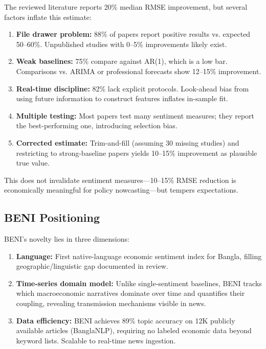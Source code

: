 \documentclass[11pt]{article}
\begin{document}
The reviewed literature reports 20\% median RMSE improvement, but several factors inflate this estimate:

\begin{enumerate}
  \item \textbf{File drawer problem:} 88\% of papers report positive results vs. expected 50--60\%. Unpublished studies with 0--5\% improvements likely exist.
  
  \item \textbf{Weak baselines:} 75\% compare against AR(1), which is a low bar. Comparisons vs. ARIMA or professional forecasts show 12--15\% improvement.
  
  \item \textbf{Real-time discipline:} 82\% lack explicit protocols. Look-ahead bias from using future information to construct features inflates in-sample fit.
  
  \item \textbf{Multiple testing:} Most papers test many sentiment measures; they report the best-performing one, introducing selection bias.
  
  \item \textbf{Corrected estimate:} Trim-and-fill (assuming 30 missing studies) and restricting to strong-baseline papers yields 10--15\% improvement as plausible true value.
\end{enumerate}

This does not invalidate sentiment measures---10--15\% RMSE reduction is economically meaningful for policy nowcasting---but tempers expectations.

\subsection{BENI Positioning}

BENI's novelty lies in three dimensions:

\begin{enumerate}
  \item \textbf{Language:} First native-language economic sentiment index for Bangla, filling geographic/linguistic gap documented in review.
  
  \item \textbf{Time-series domain model:} Unlike single-sentiment baselines, BENI tracks which macroeconomic narratives dominate over time and quantifies their coupling, revealing transmission mechanisms visible in news.
  
  \item \textbf{Data efficiency:} BENI achieves 89\% topic accuracy on 12K publicly available articles (BanglaNLP), requiring no labeled economic data beyond keyword lists. Scalable to real-time news ingestion.
\end{enumerate}
\end{document}
